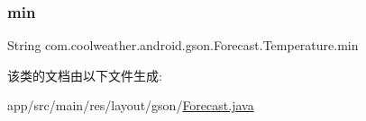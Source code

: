 \subsubsection{\texorpdfstring{min}{min}}
{\footnotesize\ttfamily String com.\+coolweather.\+android.\+gson.\+Forecast.\+Temperature.\+min}



该类的文档由以下文件生成\+:\begin{DoxyCompactItemize}
\item 
app/src/main/res/layout/gson/\mbox{\hyperlink{res_2layout_2gson_2_forecast_8java}{Forecast.\+java}}\end{DoxyCompactItemize}
